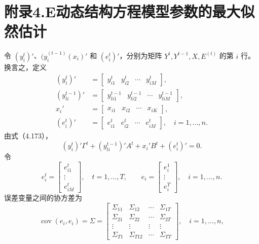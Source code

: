 \section*{附录4.E\quad 动态结构方程模型参数的最大似然估计}

令 $(y_i^t)'$、$(y_i^{(t-1)}(x_i)'$ 和 $(e_i^t)'$，分别为矩阵 $Y^t,Y^{t-1},X,E^{(t)}$ 的第 $i$ 行。换言之，定义
\begin{equation}
\begin{aligned}
(y_i^t)'&=\begin{bmatrix}y_{i1}^t&y_{i2}^t&\cdots&y_{iM}^t\end{bmatrix},\\
(y_{li}^{t-1})'&=\begin{bmatrix}y_{li1}^{t-1}&y_{li2}^{t-1}&\cdots&y_{liM}^{t-1}\end{bmatrix},\\
x_i'&=\begin{bmatrix}x_{i1}&x_{i2}&\cdots&x_{iK}\end{bmatrix},\\
(e_i^t)'&=\begin{bmatrix}e_{i1}^t&e_{i2}^t&\cdots&e_{iM}^t\end{bmatrix},
\quad i=1,\ldots,n.
\end{aligned}\tag{4.E.1}
\end{equation}
由式（4.173），
\begin{equation}
(y_i^t)'\Gamma^t+(y_{li}^{t-1})'A^t+x_i'B^t+(e_i^t)'=0.\tag{4.E.2}
\end{equation}
令
\[
e_i^t=\begin{bmatrix}e_{i1}^t\\\vdots\\e_{iM}^t\end{bmatrix},
\quad t=1,\ldots,T,\qquad
e_i=\begin{bmatrix}e_i^1\\\vdots\\e_i^T\end{bmatrix},\quad i=1,\ldots,n.
\]
误差变量之间的协方差为
\begin{equation}
\operatorname{cov}(e_i,e_i)=\Sigma=\begin{bmatrix}
\Sigma_{11}&\Sigma_{12}&\cdots&\Sigma_{1T}\\
\Sigma_{21}&\Sigma_{22}&\cdots&\Sigma_{2T}\\
\vdots&\vdots&\vdots&\vdots\\
\Sigma_{T1}&\Sigma_{T12}&\cdots&\Sigma_{TT}
\end{bmatrix},\quad i=1,\ldots,n,\tag{4.E.3}
\end{equation}
